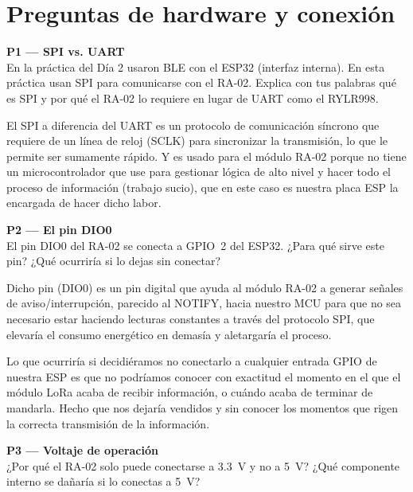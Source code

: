 \documentclass[11pt, letterpaper]{article}
\newenvironment{pregunta}[1]{%
  \begin{mdframed}[backgroundcolor=purpleLight, linecolor=purpleMain, linewidth=1pt,
    innerleftmargin=12pt, innerrightmargin=12pt,
    innertopmargin=8pt,  innerbottommargin=8pt]
  \textbf{\color{purpleMain}#1}\\[6pt]
}{\end{mdframed}\vspace{0.2cm}}
\begin{document}
\section{Preguntas de hardware y conexión}

\begin{pregunta}{P1 --- SPI vs. UART}
  En la pr\'actica del D\'ia 2 usaron BLE con el ESP32 (interfaz interna).
  En esta pr\'actica usan SPI para comunicarse con el RA-02.
  Explica con tus palabras qu\'e es SPI y por qu\'e el RA-02 lo requiere
  en lugar de UART como el RYLR998.
\end{pregunta}

El SPI a diferencia del UART es un protocolo de comunicaci\'on s\'incrono que requiere de un l\'inea de reloj (SCLK) para sincronizar la transmisi\'on, lo que le permite ser sumamente r\'apido.
Y es usado para el m\'odulo RA-02 porque no tiene un microcontrolador que use para gestionar l\'ogica de alto nivel y hacer todo el proceso de informaci\'on (trabajo sucio), que en este caso es nuestra placa ESP la encargada de hacer dicho labor.

\vspace{1cm}

\begin{pregunta}{P2 --- El pin DIO0}
  El pin DIO0 del RA-02 se conecta a GPIO~2 del ESP32. ¿Para qu\'e sirve
  este pin? ¿Qu\'e ocurrir\'ia si lo dejas sin conectar?
\end{pregunta}

Dicho pin (DIO0) es un pin digital que ayuda al m\'odulo RA-02 a generar se\~nales de aviso/interrupci\'on, parecido al NOTIFY, hacia nuestro MCU para que no sea necesario estar haciendo lecturas constantes a trav\'es del protocolo SPI, que elevar\'ia el consumo energ\'etico en demas\'ia y aletargar\'ia el proceso.

Lo que ocurrir\'ia si decidi\'eramos no conectarlo a cualquier entrada GPIO de nuestra ESP es que no podr\'iamos conocer con exactitud el momento en el que el m\'odulo LoRa acaba de recibir informaci\'on, o cu\'ando acaba de terminar de mandarla. Hecho que nos dejar\'ia vendidos y sin conocer los momentos que rigen la correcta transmisi\'on de la informaci\'on.

\vspace{1cm}

\begin{pregunta}{P3 --- Voltaje de operaci\'on}
  ¿Por qu\'e el RA-02 solo puede conectarse a 3.3~V y no a 5~V?
  ¿Qu\'e componente interno se da\~nar\'ia si lo conectas a 5~V?
\end{pregunta}
\end{document}
